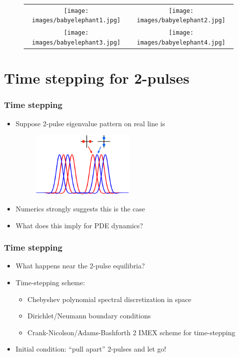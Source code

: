 \documentclass[16pt]{beamer}
\begin{document}
\begin{frame}
	\begin{figure}
	\begin{center}
	\begin{tabular}{cc}
	\texttt{[image: images/babyelephant1.jpg]} & 
	\texttt{[image: images/babyelephant2.jpg]} \\
	\texttt{[image: images/babyelephant3.jpg]} & 
	\texttt{[image: images/babyelephant4.jpg]} \\
	\end{tabular}
	\end{center}
	\end{figure}
\end{frame}

\section{Time stepping for 2-pulses}

\begin{frame}
	\frametitle{Time stepping}
	\fontsize{16}{7.2}\selectfont
	\begin{itemize}
		\item Suppose 2-pulse eigenvalue pattern on real line is 
		\begin{figure}
		\begin{center}
		\includegraphics[width=5cm]{images/DPeigpattern.eps}
		\end{center}
		\end{figure}
		\item Numerics strongly suggests this is the case
		\vspace{0.5cm}
		\item What does this imply for PDE dynamics?
	\end{itemize}
\end{frame}

\begin{frame}
	\frametitle{Time stepping}
	\fontsize{16}{7.2}\selectfont
	\begin{itemize}
		\item What happens near the 2-pulse equilibria?
		\vspace{0.5cm}
		\item Time-stepping scheme:
		\begin{itemize}
			\item Chebyshev polynomial spectral discretization in space
			\item Dirichlet/Neumann boundary conditions
			\item Crank-Nicolson/Adams-Bashforth 2 IMEX scheme for time-stepping
		\end{itemize}
		\vspace{0.5cm}
		\item Initial condition: ``pull apart'' 2-pulses and let go!
	\end{itemize}
\end{frame}
\end{document}
